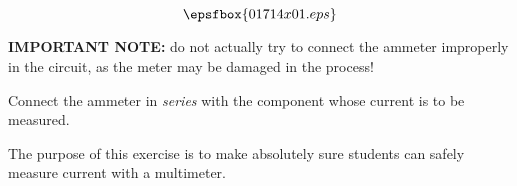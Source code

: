 

$$\epsfbox{01714x01.eps}$$

{\bf IMPORTANT NOTE:} do not actually try to connect the ammeter improperly in the circuit, as the meter may be damaged in the process!

\vfil \eject






Connect the ammeter in {\it series} with the component whose current is to be measured.







The purpose of this exercise is to make absolutely sure students can safely measure current with a multimeter.  




